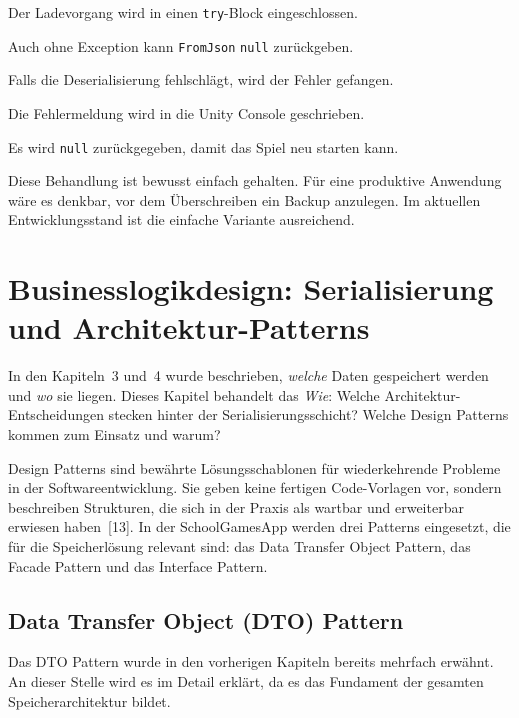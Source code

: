 \documentclass[12pt,a4paper]{article}
\begin{document}
\begin{description}[leftmargin=2em, labelwidth=1.5em]
    \item[(1)] Der Ladevorgang wird in einen \texttt{try}-Block eingeschlossen.
    \item[(2)] Auch ohne Exception kann \texttt{FromJson} \texttt{null} zurückgeben.
    \item[(3)] Falls die Deserialisierung fehlschlägt, wird der Fehler gefangen.
    \item[(4)] Die Fehlermeldung wird in die Unity Console geschrieben.
    \item[(5)] Es wird \texttt{null} zurückgegeben, damit das Spiel neu starten kann.
\end{description}

Diese Behandlung ist bewusst einfach gehalten. Für eine produktive Anwendung wäre es denkbar, vor dem Überschreiben ein Backup anzulegen. Im aktuellen Entwicklungsstand ist die einfache Variante ausreichend.


\section{Businesslogikdesign: Serialisierung und Architektur-Patterns}

In den Kapiteln~3 und~4 wurde beschrieben, \textit{welche} Daten gespeichert werden und \textit{wo} sie liegen. Dieses Kapitel behandelt das \textit{Wie}: Welche Architektur-Entscheidungen stecken hinter der Serialisierungsschicht? Welche Design Patterns kommen zum Einsatz und warum?

Design Patterns sind bewährte Lösungsschablonen für wiederkehrende Probleme in der Softwareentwicklung. Sie geben keine fertigen Code-Vorlagen vor, sondern beschreiben Strukturen, die sich in der Praxis als wartbar und erweiterbar erwiesen haben~[13]. In der SchoolGamesApp werden drei Patterns eingesetzt, die für die Speicherlösung relevant sind: das Data Transfer Object Pattern, das Facade Pattern und das Interface Pattern.

\subsection{Data Transfer Object (DTO) Pattern}

Das DTO Pattern wurde in den vorherigen Kapiteln bereits mehrfach erwähnt. An dieser Stelle wird es im Detail erklärt, da es das Fundament der gesamten Speicherarchitektur bildet.
\end{document}
